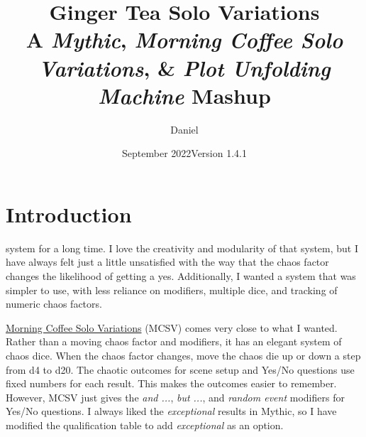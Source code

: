 

\title{
\Huge{Ginger Tea Solo Variations}
\\ \small{A \emph{Mythic}, \emph{Morning Coffee Solo Variations}, \& \emph{Plot Unfolding Machine} Mashup}
}
\date{September 2022\newline{}Version 1.4.1}
\author{Daniel}


\frontmatter
\maketitle


\mainmatter

\section{Introduction}
system for a long time. I love the creativity and modularity of that system,
but I have always felt just a little unsatisfied with the way that the chaos
factor changes the likelihood of getting a yes. Additionally, I wanted a system
that was simpler to use, with less reliance on modifiers, multiple dice, and
tracking of numeric chaos factors.

\href{https://aleaiactandaest.blogspot.com/p/downloads.html}{Morning Coffee Solo
Variations} (MCSV) comes very close to what I wanted. Rather than a moving chaos
factor and modifiers, it has an elegant system of chaos dice. When the chaos
factor changes, move the chaos die up or down a step from d4 to d20. The chaotic
outcomes for scene setup and Yes/No questions use fixed numbers for each result.
This makes the outcomes easier to remember. However, MCSV just gives the
\emph{and ...}, \emph{but ...}, and \emph{random event} modifiers for Yes/No
questions. I always liked the \emph{exceptional} results in Mythic, so I have
modified the qualification table to add \emph{exceptional} as an option.

